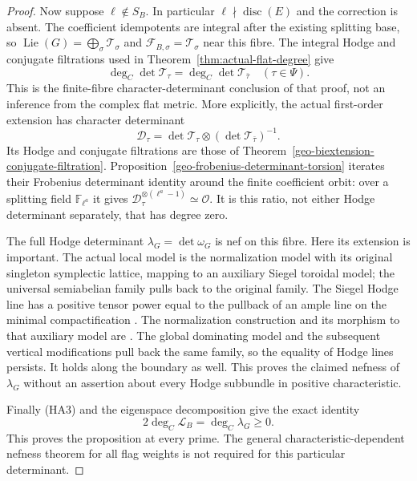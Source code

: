 \begin{proof}
Now suppose $\ell\notin S_B$.  In particular
$\ell\nmid\operatorname{disc}(E)$ and the correction is absent.
The coefficient idempotents are integral after the existing splitting
base, so $\operatorname{Lie}(G)=\bigoplus_\sigma\mathcal T_\sigma$
and $\mathcal F_{B,\sigma}=\mathcal T_\sigma$ near this fibre.
The integral Hodge and conjugate filtrations used in
Theorem~\ref{thm:actual-flat-degree} give
\[
       \deg_C\det\mathcal T_\tau
           =\deg_C\det\mathcal T_{\bar\tau}
                         \quad(\tau\in\Psi).
 \tag{HA3}
\]
This is the finite-fibre character-determinant conclusion of that
proof, not an inference from the complex flat metric.  More explicitly,
the actual first-order extension has character determinant
\[
 \mathcal D_\tau=\det\mathcal T_\tau\otimes
                       (\det\mathcal T_{\bar\tau})^{-1}.
\]
Its Hodge and conjugate filtrations are those of
Theorem~\ref{geo-biextension-conjugate-filtration}.
Proposition~\ref{geo-frobenius-determinant-torsion} iterates their
Frobenius determinant identity around the finite coefficient orbit:
over a splitting field $\mathbb F_{\ell^a}$ it gives
$\mathcal D_\tau^{\otimes(\ell^a-1)}\simeq\mathcal O$.
It is this ratio, not either Hodge determinant separately, that has
degree zero\cite{height-assembly-determinant-record}.

The full Hodge determinant $\lambda_G=\det\omega_G$ is nef on
this fibre.  Here its extension is important.  The actual local
model is the normalization model with its original singleton
symplectic lattice, mapping to an auxiliary Siegel toroidal model;
the universal semiabelian family pulls back to the original family.
The Siegel Hodge line has a positive tensor power equal to the
pullback of an ample line on the minimal compactification
\cite[Theorem 7.2.4.1(2)--(3)]{height-assembly-lan}.
The normalization construction and its morphism to that auxiliary
model are \cite[(7.7)--(7.8), Proposition 7.11]{height-assembly-lan-ramified}.
The global dominating model and the subsequent vertical modifications
pull back the same family, so the equality of Hodge lines persists.
It holds along the boundary as well.  This proves the claimed
nefness of $\lambda_G$ without an assertion about every Hodge
subbundle in positive characteristic.

Finally (HA3) and the eigenspace decomposition give the exact identity
\[
             2\deg_C\mathcal L_B=\deg_C\lambda_G\ge0.
 \tag{HA4}
\]
This proves the proposition at every prime.  The general
characteristic-dependent nefness theorem for all flag weights is
not required for this particular determinant.
\end{proof}

